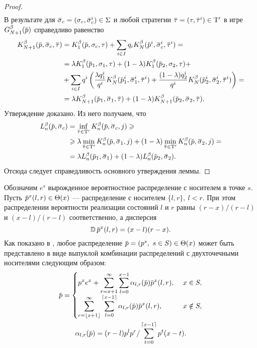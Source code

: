 {\begin{proof}
\begin{equation*}
\begin{gathered}
    \end{gathered}
  \end{equation*}
  В результате для $\sigmav_c = (\sigma_c, \sigmav_c^i) \in \Sigma$ и любой стратегии $\tauv = (\tau, \tauv^i) \in \Tau'$ в игре $\theG[N+1](\p)$ справедливо равенство
  \begin{align*}
    \K[N+1](\p, \sigmav_c, \tauv) &=
    \K[1](\p, \sigma_c, \tau) +
    \sum_{i \in I} q_i \K[N](\p^i, \sigmav^i_c, \tauv^i) =                             \\
    &= \lambda \K[1](\p_1, \sigma_1, \tau) +
    (1-\lambda) \K[1](\p_2, \sigma_2, \tau) +                                          \\
    &+ \sum_{i \in I} q^i \left(
      \frac{\lambda q^i_1}{q^i} \K[N](\p^i_1, \sigmav^i_1, \tauv^i) +
      \frac{(1-\lambda) q^i_2}{q^i} \K[N](\p^i_2, \sigmav^i_2, \tauv^i)
    \right) =                                                                          \\
    &= \lambda \K[N+1](\p_1, \sigmav_1, \tauv) +
    (1-\lambda)\K[N+1](\p_2, \sigmav_2, \tauv).
  \end{align*}
  Утверждение доказано.
  Из него получаем, что
  \begin{align*}
    \Low[n](\p, \sigmav_c)
    &= \inf_{\tauv \in \Tau'} \K[n](\p, \sigmav_c, j) \geqslant\\
    &\geqslant \lambda \min_{\tauv \in \Tau'} \K[n](\p, \sigmav_1, j) + (1-\lambda) \min_{\tauv \in \Tau'} \K[n](\p, \sigmav_2, j) =\\
    &= \lambda \Low[n](\p_1, \sigmav_1) + (1-\lambda) \Low[n](\p_2, \sigmav_2).
  \end{align*}
  Отсюда следует справедливость основного утверждения леммы.
\end{proof}

Обозначим $e^s$ вырожденное вероятностное распределение с носителем в точке $s$.
Пусть $\p^x(l, r) \in \Theta(x)$ --- распределение с носителем $\{l, r\},\ l<r$.
При этом распределении вероятности реализации состояний $l$ и $r$ равны $(r-x)/(r-l)$ и $(x-l)/(r-l)$ соответственно, а дисперсия
\[
  \D \p^x(l, r) = (x - l)(r - x).
\]
Как показано в \cite{domansky11}, любое распределение $\p = (p^s,\ s \in S) \in \Theta(x)$ может быть представлено в виде выпуклой комбинации распределений с двухточечными носителями следующим образом:
\begin{gather}
  \label{ch3:lower-bound:eq:prob-decomp-sum}
  \p = \begin{cases}
    \displaystyle
    p^x e^x + \sum_{r=x+1}^\infty \sum_{l=0}^{x-1} \alpha_{l,r}(\p) \p^x(l, r),\ & x \in S,\\
    \displaystyle
    \sum_{r=\floor{x+1}}^\infty \sum_{l=0}^{\ceil{x-1}} \alpha_{l,r}(\p) \p^x(l, r),\ & x \notin S,\\
  \end{cases}\\
  \alpha_{l,r}(\p) = (r-l) p^l p^r / \sum_{t=0}^{\ceil{x-1}} p^t (x-t). \nonumber
\end{gather}

}
